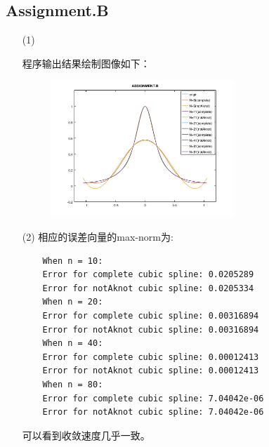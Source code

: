 \documentclass[a4paper,11.5pt,UTF8]{ctexart}
\begin{document}
\begin{large}
\subsection{Assignment.B}
\begin{itemize}
	\item[(1)] \par 程序输出结果绘制图像如下：
	\begin{figure}[H]
		\centering
		\includegraphics[width=0.65\textwidth]{../plot/figure/figure_B.jpg}
	\end{figure}
	\item[(2)] 相应的误差向量的max-norm为:
	\begin{lstlisting}
	When n = 10:
	Error for complete cubic spline: 0.0205289
	Error for notAknot cubic spline: 0.0205334
	When n = 20:
	Error for complete cubic spline: 0.00316894
	Error for notAknot cubic spline: 0.00316894
	When n = 40:
	Error for complete cubic spline: 0.00012413
	Error for notAknot cubic spline: 0.00012413
	When n = 80:
	Error for complete cubic spline: 7.04042e-06
	Error for notAknot cubic spline: 7.04042e-06
	\end{lstlisting}
	可以看到收敛速度几乎一致。
\end{itemize}


\end{large}
\end{document}
